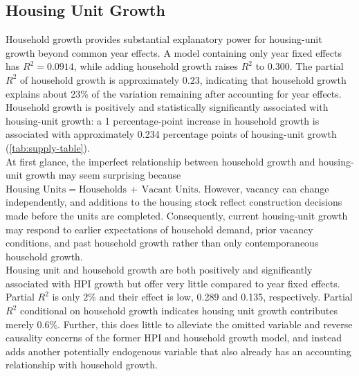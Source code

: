 \documentclass[11pt]{article}
\begin{document}
    \subsection*{Housing Unit Growth}
        Household growth provides substantial explanatory power for housing-unit growth beyond common year effects. A model containing only year fixed effects has $R^2 = 0.0914$, while adding household growth raises $R^2$ to $0.300$. The partial $R^2$ of household growth is approximately $0.23$, indicating that household growth explains about 23\% of the variation remaining after accounting for year effects. Household growth is positively and statistically significantly associated with housing-unit growth: a 1 percentage-point increase in household growth is associated with approximately 0.234 percentage points of housing-unit growth (\autoref{tab:supply-table}). \\
        At first glance, the imperfect relationship between household growth and housing-unit growth may seem surprising because $\text{Housing Units} = \text{Households}\,+\,\text{Vacant Units}$. However, vacancy can change independently, and additions to the housing stock reflect construction decisions made before the units are completed. Consequently, current housing-unit growth may respond to earlier expectations of household demand, prior vacancy conditions, and past household growth rather than only contemporaneous household growth. \\
        Housing unit and household growth are both positively and significantly associated with HPI growth but offer very little compared to year fixed effects. Partial $R^2$ is only $2\%$ and their effect is low, 0.289 and 0.135, respectively. Partial $R^2$ conditional on household growth indicates housing unit growth contributes merely 0.6\%. Further, this does little to alleviate the omitted variable and reverse causality concerns of the former HPI and household growth model, and instead adds another potentially endogenous variable that also already has an accounting relationship with household growth.

        \begin{table}[ht]
        \centering
        \caption{Supply-response and HPI regressions.}
        \label{tab:supply-table}
        \end{table}
\end{document}
